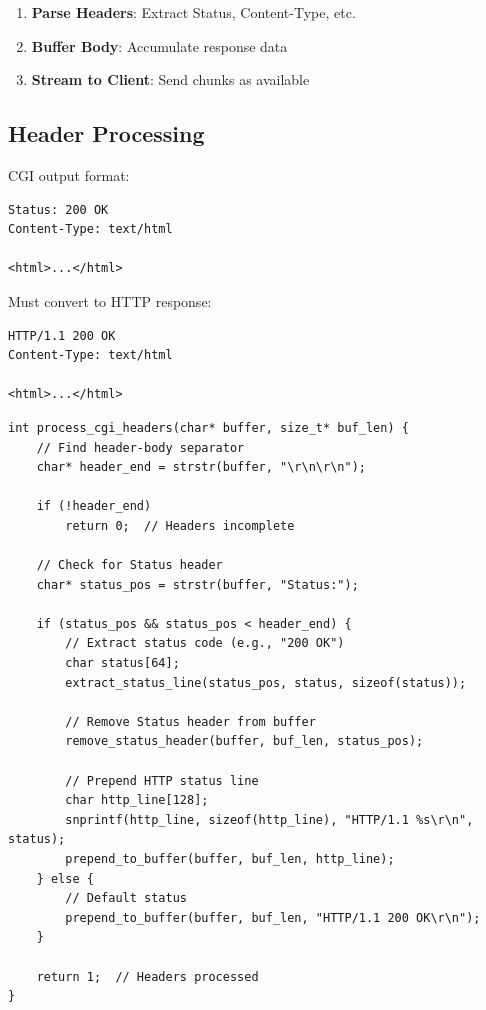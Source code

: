 \documentclass[12pt,a4paper]{article}
\begin{document}
\begin{enumerate}
    \item \textbf{Parse Headers}: Extract Status, Content-Type, etc.
    \item \textbf{Buffer Body}: Accumulate response data
    \item \textbf{Stream to Client}: Send chunks as available
\end{enumerate}

\subsection{Header Processing}

CGI output format:
\begin{verbatim}
Status: 200 OK
Content-Type: text/html

<html>...</html>
\end{verbatim}

Must convert to HTTP response:
\begin{verbatim}
HTTP/1.1 200 OK
Content-Type: text/html

<html>...</html>
\end{verbatim}

\begin{lstlisting}[caption=Header Conversion]
int process_cgi_headers(char* buffer, size_t* buf_len) {
    // Find header-body separator
    char* header_end = strstr(buffer, "\r\n\r\n");
    
    if (!header_end)
        return 0;  // Headers incomplete
    
    // Check for Status header
    char* status_pos = strstr(buffer, "Status:");
    
    if (status_pos && status_pos < header_end) {
        // Extract status code (e.g., "200 OK")
        char status[64];
        extract_status_line(status_pos, status, sizeof(status));
        
        // Remove Status header from buffer
        remove_status_header(buffer, buf_len, status_pos);
        
        // Prepend HTTP status line
        char http_line[128];
        snprintf(http_line, sizeof(http_line), "HTTP/1.1 %s\r\n", status);
        prepend_to_buffer(buffer, buf_len, http_line);
    } else {
        // Default status
        prepend_to_buffer(buffer, buf_len, "HTTP/1.1 200 OK\r\n");
    }
    
    return 1;  // Headers processed
}
\end{lstlisting}
\end{document}
